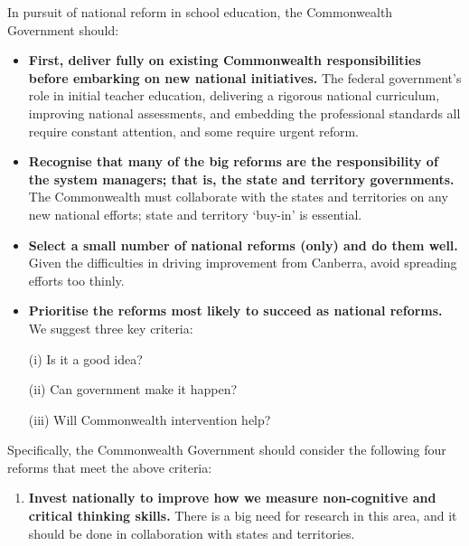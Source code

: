 
\begin{recommendations}



In pursuit of national reform in school education, the Commonwealth Government should:

\begin{itemize}
    \item \textbf{First, deliver fully on existing Commonwealth responsibilities before embarking on new national initiatives.} The federal government's role in initial teacher education, delivering a rigorous national curriculum, improving national assessments, and embedding the professional standards all require constant attention, and some require urgent reform. 
    
    \item \textbf{Recognise that many of the big reforms are the responsibility of the system managers; that is, the state and territory governments.} The Commonwealth must collaborate with the states and territories on any new national efforts; state and territory `buy-in' is essential.
    
    \item \textbf{Select a small number of national reforms (only) and do them well.} Given the difficulties in driving improvement from Canberra, avoid spreading efforts too thinly. 
    
     \item \textbf{Prioritise the reforms most likely to succeed as national reforms.} We suggest three key criteria:
     
     
    (i) Is it a good idea?
    
    (ii) Can government make it happen?
    
    (iii) Will Commonwealth intervention help?
    
    \end{itemize}
   
\newpage
 
Specifically, the Commonwealth Government should consider the following four reforms that meet the above criteria:
    
    \begin{enumerate}
   
    \item \textbf{Invest nationally to improve how we measure non-cognitive and critical thinking skills.} There is a big need for research in this area, and it should be done in collaboration with states and territories.
    

\end{enumerate}
\end{recommendations}
